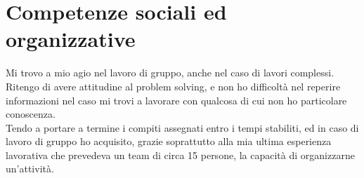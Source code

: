 \section{Competenze sociali ed organizzative}
Mi trovo a mio agio nel lavoro di gruppo, anche nel caso di lavori complessi.\\
Ritengo di avere attitudine al problem solving, e non ho difficoltà nel reperire
informazioni nel caso mi trovi a lavorare con qualcosa di cui non ho particolare conoscenza.\\
Tendo a portare a termine i compiti assegnati entro i tempi stabiliti, ed in caso
di lavoro di gruppo ho acquisito, grazie soprattutto alla mia ultima esperienza lavorativa
che prevedeva un team di circa 15 persone, la capacit\`a di organizzarne un'attivit\`a.\\
